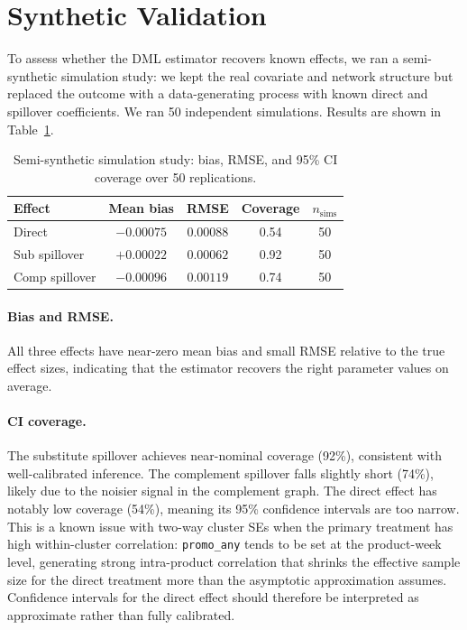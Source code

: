 \documentclass[conference]{IEEEtran}
\begin{document}
\section{Synthetic Validation}

To assess whether the DML estimator recovers known effects, we ran a
semi-synthetic simulation study: we kept the real covariate and network
structure but replaced the outcome with a data-generating process with
known direct and spillover coefficients.
We ran 50 independent simulations.
Results are shown in Table~\ref{tab:synthetic}.

\begin{table}[ht]
    \centering
    \caption{Semi-synthetic simulation study: bias, RMSE, and 95\% CI
        coverage over 50 replications.}
    \label{tab:synthetic}
    \begin{tabular}{lcccc}
        \toprule
        Effect         & Mean bias  & RMSE      & Coverage & $n_{\mathrm{sims}}$ \\
        \midrule
        Direct         & $-0.00075$ & $0.00088$ & 0.54     & 50                  \\
        Sub spillover  & $+0.00022$ & $0.00062$ & 0.92     & 50                  \\
        Comp spillover & $-0.00096$ & $0.00119$ & 0.74     & 50                  \\
        \bottomrule
    \end{tabular}
\end{table}

\paragraph{Bias and RMSE.}
All three effects have near-zero mean bias and small RMSE relative to the
true effect sizes, indicating that the estimator recovers the right
parameter values on average.

\paragraph{CI coverage.}
The substitute spillover achieves near-nominal coverage (92\%), consistent
with well-calibrated inference.
The complement spillover falls slightly short (74\%), likely due to the
noisier signal in the complement graph.
The direct effect has notably low coverage (54\%), meaning its 95\%
confidence intervals are too narrow.
This is a known issue with two-way cluster SEs when the primary treatment
has high within-cluster correlation: \texttt{promo\_any} tends to be set
at the product-week level, generating strong intra-product correlation that
shrinks the effective sample size for the direct treatment more than the
asymptotic approximation assumes.
Confidence intervals for the direct effect should therefore be interpreted as
approximate rather than fully calibrated.
\end{document}
